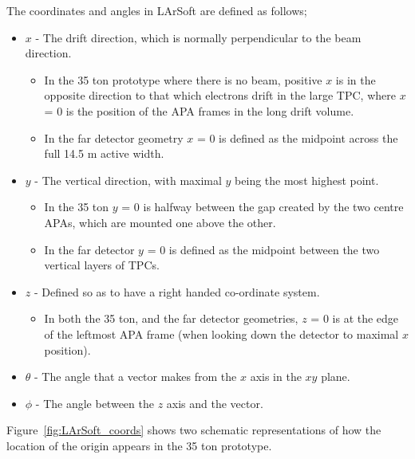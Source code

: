 The coordinates and angles in LArSoft are defined as follows;
\begin{itemize}
\item $x$ - The drift direction, which is normally perpendicular to the beam direction.
  \begin{itemize}
  \item In the 35 ton prototype where there is no beam, positive $x$ is in the opposite direction to that which electrons drift in the large TPC, where $x$ = 0 is the position of the APA frames in the long drift volume.
  \item In the far detector geometry $x$ = 0 is defined as the midpoint across the full 14.5 m active width.
  \end{itemize}
\item $y$ - The vertical direction, with maximal $y$ being the most highest point.
  \begin{itemize}
  \item In the 35 ton $y$ = 0 is halfway between the gap created by the two centre APAs, which are mounted one above the other.
  \item In the far detector $y$ = 0 is defined as the midpoint between the two vertical layers of TPCs.
  \end {itemize}
\item $z$ - Defined so as to have a right handed co-ordinate system.
  \begin{itemize}
  \item In both the 35 ton, and the far detector geometries, $z$ = 0 is at the edge of the leftmost APA frame (when looking down the detector to maximal $x$ position).
  \end{itemize}
\item $\theta$ - The angle that a vector makes from the $x$ axis in the $xy$ plane.
\item $\phi$ - The angle between the $z$ axis and the vector.
\end{itemize}
Figure~\ref{fig:LArSoft_coords} shows two schematic representations of how the location of the origin appears in the 35 ton prototype.\\

